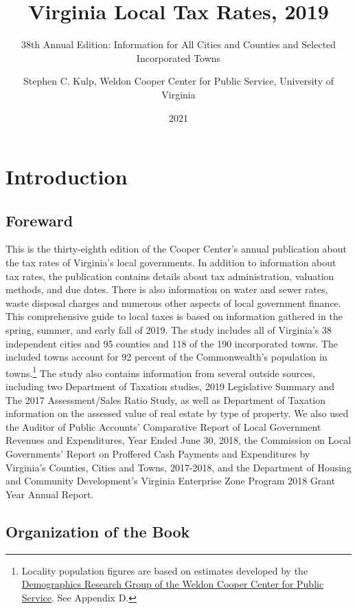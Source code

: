 \documentclass[
]{book}
\title{Virginia Local Tax Rates, 2019}
\subtitle{38th Annual Edition: Information for All Cities and Counties and Selected Incorporated Towns}
\author{Stephen C. Kulp, Weldon Cooper Center for Public Service, University of Virginia}
\date{2021}
\begin{document}
\maketitle

{
\setcounter{tocdepth}{1}
\tableofcontents
}
\hypertarget{introduction}{%
\chapter*{Introduction}\label{introduction}}

\hypertarget{foreward}{%
\section*{Foreward}\label{foreward}}

This is the thirty-eighth edition of the Cooper Center's annual publication about the tax rates of Virginia's local governments. In addition to information about tax rates, the publication contains details about tax administration, valuation methods, and due dates. There is also information on water and sewer rates, waste disposal charges and numerous other aspects of local government finance. This comprehensive guide to local taxes is based on information gathered in the spring, summer, and early fall of 2019. The study includes all of Virginia's 38 independent cities and 95 counties and 118 of the 190 incorporated towns. The included towns account for 92 percent of the Commonwealth's population in towns.\footnote{Locality population figures are based on estimates developed by the \href{https://demographics.coopercenter.org}{Demographics Research Group of the Weldon Cooper Center for Public Service}. See Appendix D.} The study also contains information from several outside sources, including two Department of Taxation studies, 2019 Legislative Summary and The 2017 Assessment/Sales Ratio Study, as well as Department of Taxation information on the assessed value of real estate by type of property. We also used the Auditor of Public Accounts' Comparative Report of Local Government Revenues and Expenditures, Year Ended June 30, 2018, the Commission on Local Governments' Report on Proffered Cash Payments and Expenditures by Virginia's Counties, Cities and Towns, 2017-2018, and the Department of Housing and Community Development's Virginia Enterprise Zone Program 2018 Grant Year Annual Report.

\hypertarget{organization-of-the-book}{%
\section*{Organization of the Book}\label{organization-of-the-book}}
\end{document}
